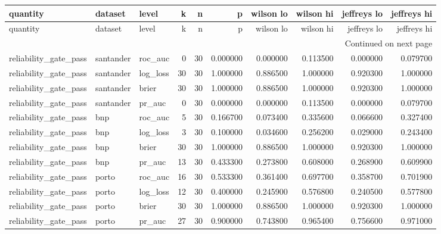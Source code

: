\begin{center}\label{tab:s5prop}\end{center}
\begingroup\tiny\setlength{\tabcolsep}{2.5pt}
\begin{longtable}{lllrrrrrrr}
\toprule
quantity & dataset & level & k & n & p & wilson lo & wilson hi & jeffreys lo & jeffreys hi \\
\midrule
\endfirsthead
\toprule
quantity & dataset & level & k & n & p & wilson lo & wilson hi & jeffreys lo & jeffreys hi \\
\midrule
\endhead
\midrule
\multicolumn{10}{r}{Continued on next page} \\
\midrule
\endfoot
\bottomrule
\endlastfoot
reliability\_gate\_pass & santander & roc\_auc & 0 & 30 & 0.000000 & 0.000000 & 0.113500 & 0.000000 & 0.079700 \\
reliability\_gate\_pass & santander & log\_loss & 30 & 30 & 1.000000 & 0.886500 & 1.000000 & 0.920300 & 1.000000 \\
reliability\_gate\_pass & santander & brier & 30 & 30 & 1.000000 & 0.886500 & 1.000000 & 0.920300 & 1.000000 \\
reliability\_gate\_pass & santander & pr\_auc & 0 & 30 & 0.000000 & 0.000000 & 0.113500 & 0.000000 & 0.079700 \\
reliability\_gate\_pass & bnp & roc\_auc & 5 & 30 & 0.166700 & 0.073400 & 0.335600 & 0.066600 & 0.327400 \\
reliability\_gate\_pass & bnp & log\_loss & 3 & 30 & 0.100000 & 0.034600 & 0.256200 & 0.029000 & 0.243400 \\
reliability\_gate\_pass & bnp & brier & 30 & 30 & 1.000000 & 0.886500 & 1.000000 & 0.920300 & 1.000000 \\
reliability\_gate\_pass & bnp & pr\_auc & 13 & 30 & 0.433300 & 0.273800 & 0.608000 & 0.268900 & 0.609900 \\
reliability\_gate\_pass & porto & roc\_auc & 16 & 30 & 0.533300 & 0.361400 & 0.697700 & 0.358700 & 0.701900 \\
reliability\_gate\_pass & porto & log\_loss & 12 & 30 & 0.400000 & 0.245900 & 0.576800 & 0.240500 & 0.577800 \\
reliability\_gate\_pass & porto & brier & 30 & 30 & 1.000000 & 0.886500 & 1.000000 & 0.920300 & 1.000000 \\
reliability\_gate\_pass & porto & pr\_auc & 27 & 30 & 0.900000 & 0.743800 & 0.965400 & 0.756600 & 0.971000 \\

\end{longtable}
